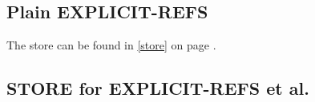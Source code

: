 \documentclass[../codeprint.tex]{subfiles}
\begin{document}
\subsection{Plain EXPLICIT-REFS}
\label{lang:EXPLICIT-REFS}
The store can be found in \autoref{store} on page \pageref{store}.



\subsection{STORE for EXPLICIT-REFS et al.}

\end{document}
